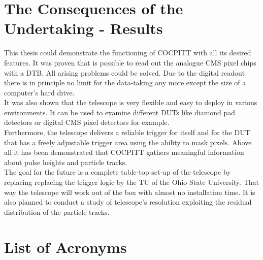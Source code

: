 \documentclass[british,11pt,a4paper]{memoir}
\begin{document}
\chapter{The Consequences of the Undertaking - Results}

This thesis could demonstrate the functioning of COCPITT with all its desired features. It was proven that is possible to read out the analogue CMS pixel chips with a \ac{DTB}. All arising problems could be solved. Due to the digital readout there is in principle no limit for the data-taking any more except the size of a computer's hard drive.\\
It was also shown that the telescope is very flexible and easy to deploy in various environments. It can be used to examine different \ac{DUT}s like diamond pad detectors or digital CMS pixel detectors for example.\\
Furthermore, the telescope delivers a reliable trigger for itself and for the \ac{DUT} that has a freely adjustable trigger area using the ability to mask pixels. Above all it has been demonstrated that COCPITT gathers meaningful information about pulse heights and particle tracks.\\
The goal for the future is a complete table-top set-up of the telescope by replacing replacing the trigger logic by the \ac{TU} of the Ohio State University. That way the telescope will work out of the box with almost no installation time. It is also planned to conduct a study of telescope's resolution exploiting the residual distribution of the particle tracks.
\chapter*{List of Acronyms}

\end{document}
